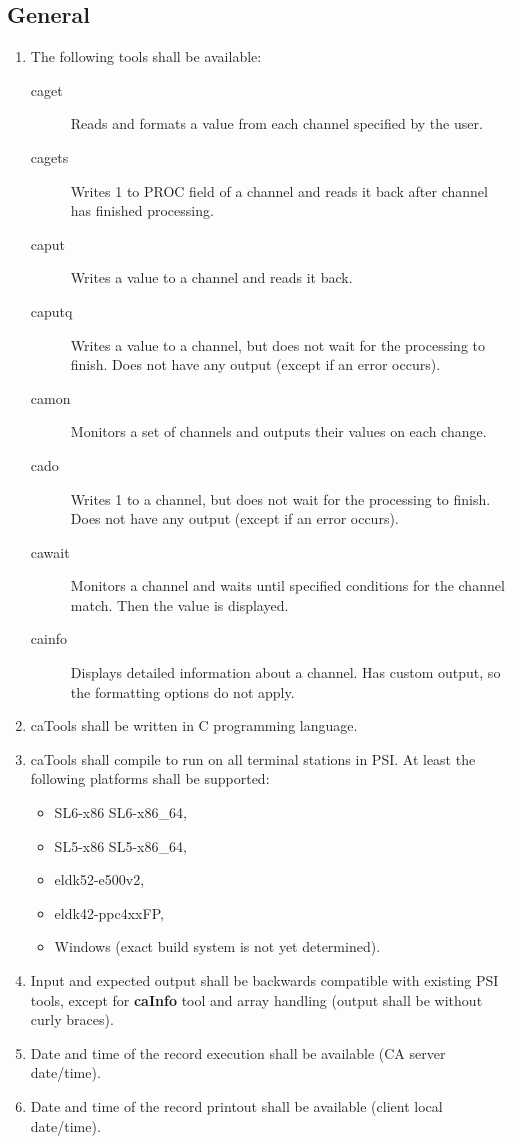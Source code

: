 \documentclass[12pt,a4paper]{article}
\begin{document}
\subsection{General}
\begin{enumerate}
	\item The following tools shall be available:
	\begin{description}
		\item [caget] Reads and formats a value from each channel specified by the user. 
		\item [cagets] Writes 1 to PROC field of a channel and reads it back after channel has finished processing.
		\item [caput] Writes a value to a channel and reads it back.
		\item [caputq] Writes a value to a channel, but does not wait for the processing to finish. Does not have any output (except if an error occurs).
		\item [camon] Monitors a set of channels and outputs their values on each change.
		\item [cado] Writes 1 to a channel, but does not wait for the processing to finish. Does not have any output (except if an error occurs).
		\item [cawait] Monitors a channel and waits until specified conditions for the channel match. Then the value is displayed.
		\item [cainfo] Displays detailed information about a channel. Has custom output, so the formatting options do not apply.
	\end{description}
	\item caTools shall be written in C programming language.
	\item caTools shall compile to run on all terminal stations in PSI. At least the following platforms shall be supported:
	\begin{itemize}
		\item SL6-x86 SL6-x86\_64,
		\item SL5-x86 SL5-x86\_64,
		\item eldk52-e500v2,
		\item eldk42-ppc4xxFP,
		\item Windows (exact build system is not yet determined).
	\end{itemize}
	\item Input and expected output shall be backwards compatible with existing PSI tools, except for \textbf{caInfo} tool and array handling (output shall be without curly braces).
	\item Date and time of the record execution shall be available (CA server date/time).
	\item Date and time of the record printout shall be available (client local date/time).
\end{enumerate}
\end{document}
